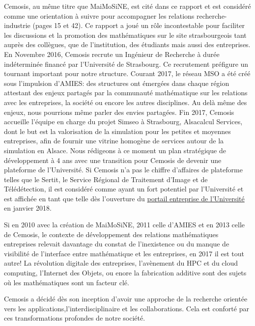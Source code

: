 Cemosis, au même titre que MaiMoSiNE, est cité dans ce rapport et est considéré comme une orientation à suivre pour accompagner les relations recherche-industrie (pages 15 et 42). 
Ce rapport a joué un rôle incontestable pour faciliter les discussions et la promotion des mathématiques sur le site strasbourgeois tant auprès des collègues, que de l'institution, des étudiants mais aussi des entreprises.
En Novembre 2016, Cemosis recrute un Ingénieur de Recherche à durée indéterminée financé par l'Université de Strasbourg. Ce recrutement préfigure un tournant important pour notre structure.
Courant 2017, le réseau MSO a été créé sous l'impulsion d'AMIES: des structures ont émergées dans chaque région attestant des enjeux partagés par la communauté mathématique sur les relations avec les entreprises, la société ou encore les autres disciplines. 
Au delà même des enjeux, nous pourrions même parler des envies partagées.
Fin 2017, Cemosis accueille l'équipe en charge du projet Simseo à Strasbourg, Alsacalcul Services, dont le but est la valorisation de la simulation pour les petites et moyennes entreprises, afin de fournir une vitrine homogène de services autour de la simulation en Alsace.
Nous rédigeons à ce moment un plan stratégique de développement à 4 ans avec une transition pour Cemosis de devenir une plateforme de l'Université. 
Si Cemosis n'a pas le chiffre d'affaires de plateforme telles que le Sertit, le Service Régional de Traitement d'Image et de Télédétection, il est considéré comme ayant un fort potentiel par l'Université et est affichée en tant que telle  dès l'ouverture du \href{http://entreprises.unistra.fr/innover/decouvrir-les-plateformes-technologiques-de-luniversite/#c3136}{portail entreprise de l'Université} en janvier 2018.

Si en 2010 avec la création de MaiMoSiNE, 2011 celle d'AMIES et en 2013 celle de Cemosis, le contexte de développement des relations mathématiques entreprises relevait davantage du constat de l'inexistence ou du manque de visibilité de l'interface entre mathématique et les entreprises, en 2017 il est tout autre! La révolution digitale des entreprises, l'avènement du HPC et du cloud computing, l'Internet des Objets, ou enore la fabrication additive sont des sujets où  les mathématiques sont un facteur clé. 

Cemosis a décidé dès son inception d'avoir une approche de la recherche orientée vers les applications,l'interdisciplinaire et les collaborations. Cela est conforté par ces transformations profondes de notre société.